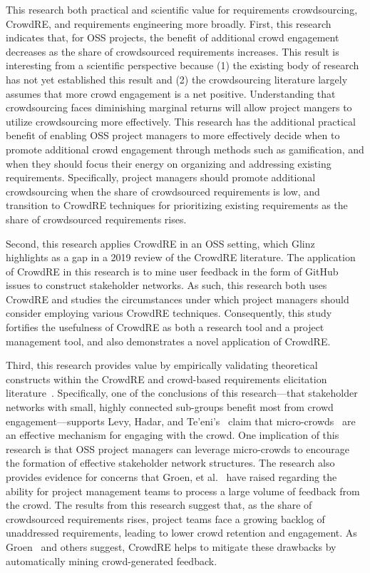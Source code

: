 This research both practical and scientific value for requirements crowdsourcing, CrowdRE, and requirements engineering more broadly. First, this research indicates that, for OSS projects, the benefit of additional crowd engagement decreases as the share of crowdsourced requirements increases. This result is interesting from a scientific perspective because (1) the existing body of research has not yet established this result and (2) the crowdsourcing literature largely assumes that more crowd engagement is a net positive. Understanding that crowdsourcing faces diminishing marginal returns will allow project mangers to utilize crowdsourcing more effectively. This research has the additional practical benefit of enabling OSS project managers to more effectively decide when to promote additional crowd engagement through methods such as gamification, and when they should focus their energy on organizing and addressing existing requirements. Specifically, project managers should promote additional crowdsourcing when the share of crowdsourced requirements is low, and transition to CrowdRE techniques for prioritizing existing requirements as the share of crowdsourced requirements rises.

Second, this research applies CrowdRE in an OSS setting, which Glinz~\cite{glinz} highlights as a gap in a 2019 review of the CrowdRE literature. The application of CrowdRE in this research is to mine user feedback in the form of GitHub issues to construct stakeholder networks. As such, this research both uses CrowdRE and studies the circumstances under which project managers should consider employing various CrowdRE techniques. Consequently, this study fortifies the usefulness of CrowdRE as both a research tool and a project management tool, and also demonstrates a novel application of CrowdRE.

Third, this research provides value by empirically validating theoretical constructs within the CrowdRE and crowd-based requirements elicitation literature~\cite{glinz}. Specifically, one of the conclusions of this research---that stakeholder networks with small, highly connected sub-groups benefit most from crowd engagement---supports Levy, Hadar, and Te'eni's~\cite{levy} claim that micro-crowds~\cite{levy} are an effective mechanism for engaging with the crowd. One implication of this research is that OSS project managers can leverage micro-crowds to encourage the formation of effective stakeholder network structures. The research also provides evidence for concerns that Groen, et al.~\cite{groen} have raised regarding the ability for project management teams to process a large volume of feedback from the crowd. The results from this research suggest that, as the share of crowdsourced requirements rises, project teams face a growing backlog of unaddressed requirements, leading to lower crowd retention and engagement. As Groen~\cite{groen} and others suggest, CrowdRE helps to mitigate these drawbacks by automatically mining crowd-generated feedback.

